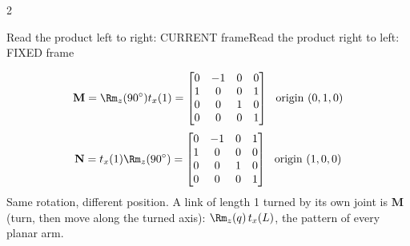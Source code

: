 \begin{multicols}{2}
\begin{twoway}{Read the product left to right: CURRENT frame}{Read the product right to left: FIXED frame}
\end{twoway}
\begin{worked}
\[\mathbf M=\Rm_z(90^\circ)t_x(1)=\begin{bmatrix}0&-1&0&0\\1&0&0&1\\0&0&1&0\\0&0&0&1\end{bmatrix}\ \ \text{origin }(0,1,0)\]
\[\mathbf N=t_x(1)\Rm_z(90^\circ)=\begin{bmatrix}0&-1&0&1\\1&0&0&0\\0&0&1&0\\0&0&0&1\end{bmatrix}\ \ \text{origin }(1,0,0)\]
Same rotation, different position. A link of length 1 turned by its own joint is $\mathbf M$ (turn, then move along the turned axis): $\Rm_z(q)\,t_x(L)$, the pattern of every planar arm. \chk
\end{worked}


\end{multicols}
